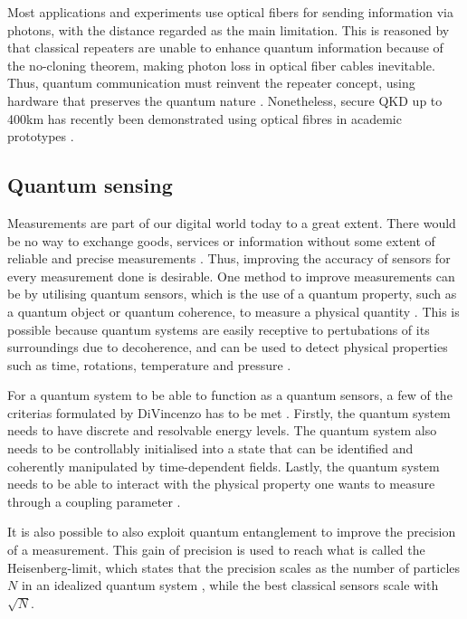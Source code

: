 Most applications and experiments use optical fibers for sending information via photons, with the distance regarded as the main limitation. This is reasoned by that classical repeaters are unable to enhance quantum information because of the no-cloning theorem, making photon loss in optical fiber cables inevitable. Thus, quantum communication must reinvent the repeater concept, using hardware that preserves the quantum nature \cite{Acin2018}. Nonetheless, secure QKD up to 400km has recently been demonstrated using optical fibres in academic prototypes \cite{Boaron2018}.

\subsection{Quantum sensing}

Measurements are part of our digital world today to a great extent. There would be no way to exchange goods, services or information without some extent of reliable and precise measurements \cite{Acin2018}. Thus, improving the accuracy of sensors for every measurement done is desirable. One method to improve measurements can be by utilising quantum sensors, which is the use of a quantum property, such as a quantum object or quantum coherence, to measure a physical quantity \cite{Degen2017}. This is possible because quantum systems are easily receptive to pertubations of its surroundings due to decoherence, and can be used to detect physical properties such as time, rotations, temperature and pressure \cite{Degen2017}.

For a quantum system to be able to function as a quantum sensors, a few of the criterias formulated by DiVincenzo has to be met \cite{DiVincenzo2000}. Firstly, the quantum system needs to have discrete and resolvable energy levels. The quantum system also needs to be controllably initialised into a state that can be identified and coherently manipulated by time-dependent fields. Lastly, the quantum system needs to be able to interact with the physical property one wants to measure through a coupling parameter \cite{Degen2017}.

It is also possible to also exploit quantum entanglement to improve the precision of a measurement. This gain of precision is used to reach what is called the Heisenberg-limit, which states that the precision scales as the number of particles $N$ in an idealized quantum system \cite{Degen2017, Acin2018}, while the best classical sensors scale with $\sqrt{N}$.

